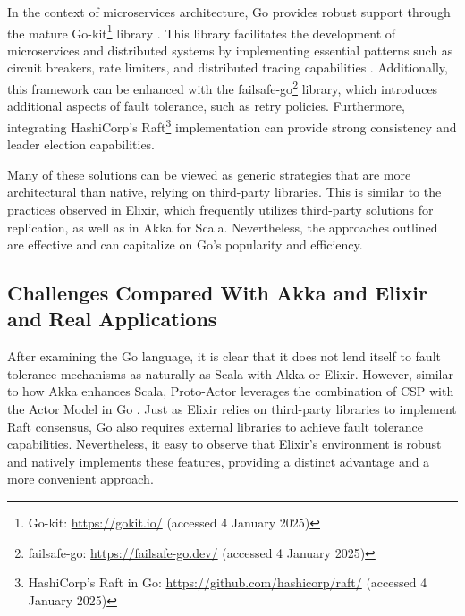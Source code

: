 
In the context of microservices architecture, Go provides robust support through the mature Go-kit\footnote{Go-kit: \url{https://gokit.io/} (accessed 4 January 2025)} library \cite{go-kit-docs}. This library facilitates the development of microservices and distributed systems by implementing essential patterns such as circuit breakers, rate limiters, and distributed tracing capabilities \cite{go-kit-docs, Shuiskov2022}. Additionally, this framework can be enhanced with the failsafe-go\footnote{failsafe-go: \url{https://failsafe-go.dev/} (accessed 4 January 2025)} library, which introduces additional aspects of fault tolerance, such as retry policies. Furthermore, integrating HashiCorp's Raft\footnote{HashiCorp's Raft in Go: \url{https://github.com/hashicorp/raft/} (accessed 4 January 2025)} implementation can provide strong consistency and leader election capabilities.

Many of these solutions can be viewed as generic strategies that are more architectural than native, relying on third-party libraries. This is similar to the practices observed in Elixir, which frequently utilizes third-party solutions for replication, as well as in Akka for Scala. Nevertheless, the approaches outlined are effective and can capitalize on Go's popularity and efficiency.

\subsection{Challenges Compared With Akka and Elixir and Real Applications}

After examining the Go language, it is clear that it does not lend itself to fault tolerance mechanisms as naturally as Scala with Akka or Elixir. However, similar to how Akka enhances Scala, Proto-Actor leverages the combination of CSP with the Actor Model in Go \cite{proto-actor-docs}. Just as Elixir relies on third-party libraries to implement Raft consensus, Go also requires external libraries to achieve fault tolerance capabilities. Nevertheless, it easy to observe that Elixir's environment is robust and natively implements these features, providing a distinct advantage and a more convenient approach.

